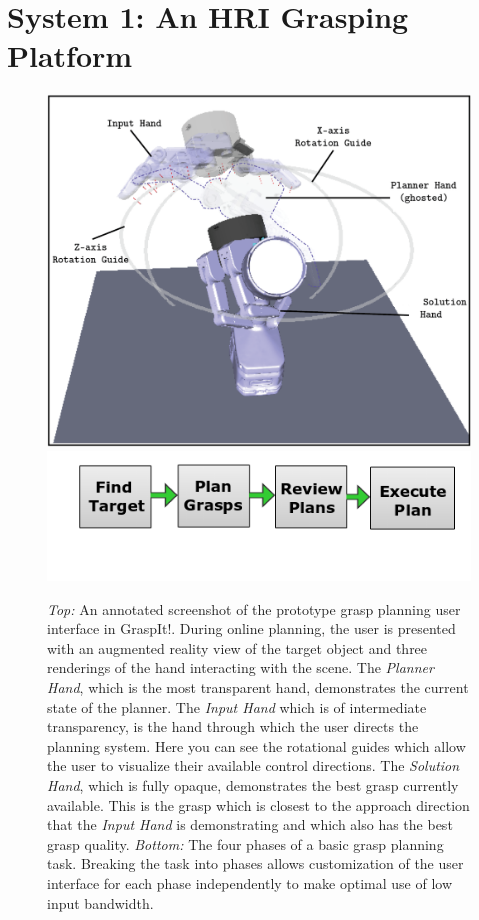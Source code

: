 \section{System 1: An HRI Grasping Platform}
\setcounter{subsection}{0}
\label{sec:pipeline_1}
\begin{figure}
	\centering
	\includegraphics[width=.95\columnwidth]{ui_1.png}\\
	\includegraphics[width=.99\columnwidth]{images_4/overview_pipeline.png}\\
	\caption{ \emph{Top:} An annotated screenshot of the prototype grasp planning user interface in GraspIt!. During online planning, the user is presented with an augmented reality view of the target object and three renderings of the hand interacting with the scene. The \emph{Planner Hand}, which is the most transparent hand, demonstrates the current state of the planner. The \emph{Input Hand} which is of intermediate transparency, is the hand through which the user directs the planning system. Here you can see the rotational guides which allow the user to visualize their available control directions. The \emph{Solution Hand}, which is fully opaque, demonstrates the best grasp currently available. This is the grasp which is closest to the approach direction that the \emph{Input Hand} is demonstrating and which also has the best grasp quality. \emph{Bottom:} The four phases of a basic grasp planning task. Breaking the task into phases allows customization of the user interface for each phase independently to make optimal use of low input bandwidth.}
	\label{fig:overview_pipeline}
\end{figure}

